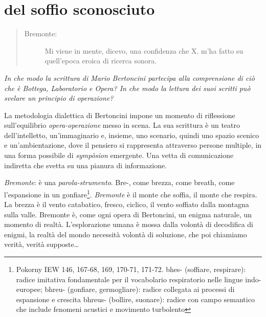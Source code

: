 \section*{del soffio sconosciuto}

\begin{quote}
  \begin{sf}
    \small
    \begin{description}
      \item[Bremonte:] Mi viene in mente, dicevo, una confidenza che X. m’ha
      fatto su quell’epoca eroica di ricerca sonora.
    \end{description}
  \end{sf}
\end{quote}

\emph{In che modo la scrittura di Mario Bertoncini partecipa alla comprensione
di ciò che è Bottega, Laboratorio e Opera? In che modo la lettura dei suoi
scritti può svelare un principio di operazione?}

La metodologia dialettica di Bertoncini impone un momento di riflessione
sull'equilibrio \emph{opera-operazione} messo in scena. La sua scrittura è un
teatro dell'intelletto, un'immaginario e, insieme, uno scenario, quindi uno
spazio scenico e un'ambientazione, dove il pensiero si rappresenta attraverso
persone multiple, in una forma possibile di \emph{sympòsion} emergente. Una
vetta di comunicazione indiretta che svetta su una pianura di informazione.

\emph{Bremonte}: è una \emph{parola-strumento}. {\phonfont Bre-}, come brezza,
come breath, come l'espansione in un gonfiare\footnote{Pokorny IEW 146, 167-68,
  169, 170-71, 171-72. {\phonfont bhes-} (soffiare, respirare): radice imitativa
  fondamentale per il vocabolario respiratorio nelle lingue indo-europee;
  {\phonfont bhreu-} (gonfiare, germogliare): radice collegata ai processi di
  espansione e crescita {\phonfont bhreus-} (bollire, suonare): radice con campo
  semantico che include fenomeni acustici e movimento turbolento}.
\emph{Bremonte} è il monte che soffia, il monte che respira. La brezza è il vento
catabatico, fresco, ciclico, il vento soffiato dalla montagna sulla valle.
Bremonte è, come ogni opera di Bertoncini, un enigma naturale, un momento
di realtà. L'esplorazione umana è mossa dalla volontà di decodifica di enigmi,
la realtà del mondo necessità volontà di soluzione, che poi chiamiamo verità,
verità supposte\ldots

